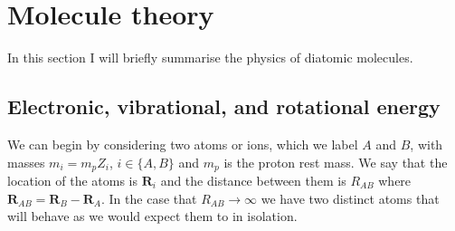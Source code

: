 
\section{Molecule theory}
\label{theory:molecules}


In this section I will briefly summarise the physics of diatomic molecules.

\subsection{Electronic, vibrational, and rotational energy}

We can begin by considering two atoms or ions, which we label $A$ and $B$,
with masses  $m_i = m_p Z_i$, $i\in\{A,B\}$ and $m_p$ is the proton rest mass. We say that the location of the
atoms is $\mathbf{R}_i$ and the distance between them is
$R_{AB}$ where $\mathbf{R}_{AB} = \mathbf{R}_B - \mathbf{R}_A$. In the case
that $R_{AB} \rightarrow \infty$ we have two distinct atoms that will behave 
as we would expect them to in isolation. 

